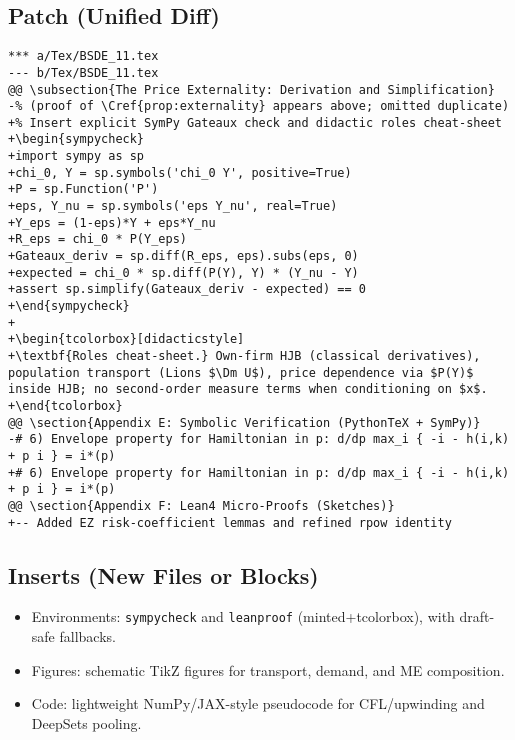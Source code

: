 ﻿\documentclass[11pt,letterpaper,oneside]{article}
\numberwithin{equation}{section}
\newenvironment{sympycheck}
  {\begin{tcolorbox}[sympycheckstyle]\VerbatimEnvironment\begin{verbatim}}
  {\end{verbatim}\end{tcolorbox}}
\renewenvironment{sympycheck}{\VerbatimEnvironment\begin{tcolorbox}[sympycheckstyle]\begin{Verbatim}[fontsize=\small]}{\end{Verbatim}\end{tcolorbox}}
\newcommand{\1}{\mathbf{1}}
\newcommand{\Dm}{D\_m}
\begin{document}
\begin{tcolorbox}[didacticstyle]
\begin{itemize}[leftmargin=1.1em,itemsep=0.25em]
\subsection*{Patch (Unified Diff)}
\begin{tcolorbox}[sympycheckstyle,title={Representative Unified Diff (excerpt)}]
\begin{Verbatim}[fontsize=\small]
*** a/Tex/BSDE_11.tex
--- b/Tex/BSDE_11.tex
@@ \subsection{The Price Externality: Derivation and Simplification}
-% (proof of \Cref{prop:externality} appears above; omitted duplicate)
+% Insert explicit SymPy Gateaux check and didactic roles cheat-sheet
+\begin{sympycheck}
+import sympy as sp
+chi_0, Y = sp.symbols('chi_0 Y', positive=True)
+P = sp.Function('P')
+eps, Y_nu = sp.symbols('eps Y_nu', real=True)
+Y_eps = (1-eps)*Y + eps*Y_nu
+R_eps = chi_0 * P(Y_eps)
+Gateaux_deriv = sp.diff(R_eps, eps).subs(eps, 0)
+expected = chi_0 * sp.diff(P(Y), Y) * (Y_nu - Y)
+assert sp.simplify(Gateaux_deriv - expected) == 0
+\end{sympycheck}
+
+\begin{tcolorbox}[didacticstyle]
+\textbf{Roles cheat-sheet.} Own-firm HJB (classical derivatives), population transport (Lions $\Dm U$), price dependence via $P(Y)$ inside HJB; no second-order measure terms when conditioning on $x$.
+\end{tcolorbox}
@@ \section{Appendix E: Symbolic Verification (PythonTeX + SymPy)}
-# 6) Envelope property for Hamiltonian in p: d/dp max_i { -i - h(i,k) + p i } = i*(p)
+# 6) Envelope property for Hamiltonian in p: d/dp max_i { -i - h(i,k) + p i } = i*(p)
@@ \section{Appendix F: Lean4 Micro-Proofs (Sketches)}
+-- Added EZ risk-coefficient lemmas and refined rpow identity
\end{Verbatim}
\end{tcolorbox}

\subsection*{Inserts (New Files or Blocks)}
\begin{itemize}[leftmargin=1.2em]
  \item Environments: \texttt{sympycheck} and \texttt{leanproof} (minted+tcolorbox), with draft-safe fallbacks.
  \item Figures: schematic TikZ figures for transport, demand, and ME composition.
  \item Code: lightweight NumPy/JAX-style pseudocode for CFL/upwinding and DeepSets pooling.
\end{itemize}


\end{itemize}
\end{tcolorbox}
\end{document}

